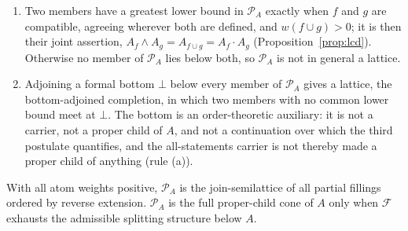 \begin{theorem}
\begin{enumerate}
\item[(iv)] Two members have a greatest lower bound in $\mathcal{P}_A$ exactly when $f$ and $g$ are compatible, agreeing wherever both are defined, and $w(f \cup g) > 0$; it is then their joint assertion, $A_f \wedge A_g = A_{f \cup g} = A_f \cdot A_g$ (Proposition~\ref{prop:lcd}). Otherwise no member of $\mathcal{P}_A$ lies below both, so $\mathcal{P}_A$ is not in general a lattice.
\item[(v)] Adjoining a formal bottom $\bot$ below every member of $\mathcal{P}_A$ gives a lattice, the bottom-adjoined completion, in which two members with no common lower bound meet at $\bot$. The bottom is an order-theoretic auxiliary: it is not a carrier, not a proper child of $A$, and not a continuation over which the third postulate quantifies, and the all-statements carrier is not thereby made a proper child of anything (rule (a)).
\end{enumerate}
With all atom weights positive, $\mathcal{P}_A$ is the join-semilattice of all partial fillings ordered by reverse extension. $\mathcal{P}_A$ is the full proper-child cone of $A$ only when $\mathcal{F}$ exhausts the admissible splitting structure below $A$.
\end{theorem}
